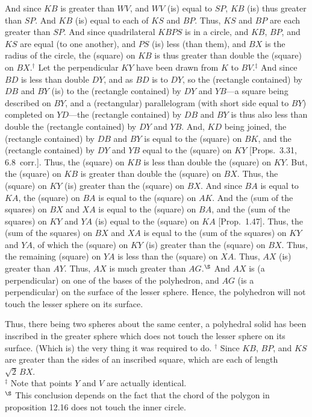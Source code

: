 And since $KB$ is greater than $WV$, and $WV$ (is) equal to $SP$, $KB$ (is) thus greater than
$SP$. And $KB$ (is) equal to each of $KS$ and $BP$. Thus, $KS$ and $BP$ are each greater than $SP$. 
And since quadrilateral $KBPS$ is in a circle, and $KB$, $BP$, and $KS$ are equal (to one another), and $PS$ (is) less (than them),
and $BX$ is the radius of the circle, the (square) on $KB$ is thus greater than
double the (square) on $BX$.$^\dag$
Let the perpendicular  $KY$ have been drawn from $K$ to $BV$.$^\ddag$ And since $BD$ is less than double
$DY$, and as $BD$ is to $DY$, so the (rectangle contained) by $DB$ and $BY$ (is) to the (rectangle contained) by $DY$
and $YB$---a square being described on $BY$, and a (rectangular) parallelogram (with short side equal to $BY$) completed on $YD$---the (rectangle contained) by $DB$ and $BY$ is thus also less than double the (rectangle contained) by $DY$ and $YB$.
And, $KD$ being joined, the (rectangle contained) by $DB$ and $BY$ is equal to the (square) on $BK$, and the
(rectangle contained) by $DY$ and $YB$ equal to the (square) on $KY$ [Props.~3.31, 6.8~corr.]. Thus, the (square) on $KB$ is  less than double the (square) on $KY$. But, the (square) on $KB$ is greater than
double the (square) on $BX$. 
Thus, the (square) on $KY$ (is) greater than the (square) on $BX$.  And since $BA$ is equal to $KA$, the (square) on $BA$ is
equal to the (square) on $AK$. And the (sum of the squares) on $BX$ and $XA$ is equal to the (square) on $BA$, and
the (sum of the squares) on $KY$ and $YA$ (is) equal to the (square) on 
$KA$   [Prop.~1.47]. 
Thus, the (sum of the squares) on $BX$ and $XA$ is equal to the (sum of the squares) on $KY$ and $YA$, of
which the (square) on $KY$ (is) greater than the (square) on $BX$. Thus, the remaining (square) on $YA$ is less than the
(square) on $XA$. Thus, $AX$ (is) greater than $AY$. Thus, $AX$ is much greater than $AG$.$^\S$ And $AX$ is (a perpendicular) on one of the bases of the
polyhedron, and $AG$ (is a perpendicular) on the surface of the lesser sphere. Hence, the polyhedron will not touch the lesser sphere on its
surface.

Thus, there being two spheres about the same center, a polyhedral solid has been inscribed in the greater sphere which does not
touch the lesser sphere on its surface. (Which is) the very thing it was required to do.
{\footnotesize\noindent$^\dag$ Since $KB$, $BP$,
and $KS$ are greater than the sides of an inscribed square, which are each of length $\sqrt{2}\,BX$.\\
$^\ddag$ Note that points $Y$ and $V$ are actually identical.\\
$^\S$ This conclusion depends on the fact that the chord of the polygon in proposition 12.16 does not touch the inner circle.}~\\



